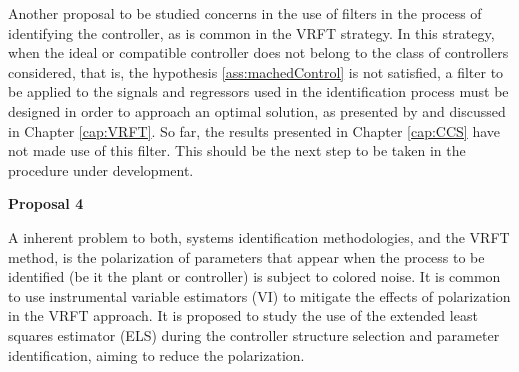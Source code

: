 Another proposal to be studied concerns in the use of filters in the process of identifying the controller, as is common in the VRFT strategy. In this strategy, when the ideal or compatible controller does not belong to the class of controllers considered, that is, the hypothesis \ref{ass:machedControl} is not satisfied, a filter to be applied to the signals and regressors used in the identification process must be designed in order to approach an optimal solution, as presented by \cite{campi2002, campi2006} and discussed in Chapter \ref{cap:VRFT}.
So far, the results presented in Chapter \ref{cap:CCS} have not made use of this filter. This should be the next step to be taken in the procedure under development.

\medskip
\textbf{Proposal 4}

A inherent problem to both, systems identification methodologies, and the VRFT method, is the polarization of parameters that appear when the process to be identified (be it the plant or controller) is subject to colored noise. It is common to use instrumental variable estimators (VI) to mitigate the effects of polarization in the VRFT approach. It is proposed to study the use of the extended least squares estimator (ELS) during the controller structure selection and parameter identification, aiming to reduce the polarization.



